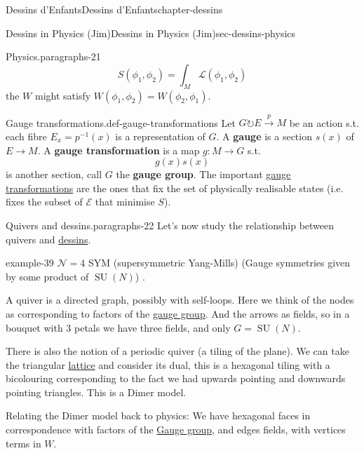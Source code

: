 \documentclass[oneside,10pt,]{book}
\newcommand{\terminology}[1]{\textbf{#1}}
\numberwithin{equation}{section}
\newcommand{\inv}{^{-1}}
\newcommand{\acts}{\circlearrowright}
\DeclareMathOperator{\specialunitary}{SU}
\begin{document}
\begin{chapterptx}{Dessins d'Enfants}{}{Dessins d'Enfants}{}{}{chapter-dessins}
\begin{sectionptx}{Dessins in Physics (Jim)}{}{Dessins in Physics (Jim)}{}{}{sec-dessins-physics}
\begin{paragraphs}{Physics.}{paragraphs-21}
\begin{equation*}
S(\phi_1, \phi_2) = \int_M \mathcal L(\phi_1,\phi_2)
\end{equation*}
the \(W\) might satisfy \(W(\phi_1, \phi_2) = W(\phi_2, \phi_1)\).%
\begin{definition}{Gauge transformations.}{def-gauge-transformations}%
\hypertarget{p-771}{}%
Let \(G \acts E \xrightarrow p M\) be an action s.t. each fibre \(E_x = p \inv(x)\) is a representation of \(G\). A \terminology{gauge} is a section \(s(x)\) of \(E \to M\). A \terminology{gauge transformation} is a map \(g\colon M \to G\) s.t.%
\begin{equation*}
g(x) s(x)
\end{equation*}
is another section, call \(G\) the \terminology{gauge group}. The important \hyperref[def-gauge-transformations]{gauge transformations} are the ones that fix the set of physically realisable states (i.e. fixes the subset of \(\mathcal E\) that minimise \(S\)).%
\end{definition}
\end{paragraphs}%
\begin{paragraphs}{Quivers and dessins.}{paragraphs-22}%
\hypertarget{p-772}{}%
Let's now study the relationship between quivers and \hyperref[def-dessin-denfant]{dessins}.%
\begin{example}{}{example-39}%
\hypertarget{p-773}{}%
\(\mathcal N = 4\) SYM (supersymmetric Yang-Mills) (Gauge symmetries given by some product of \(\specialunitary (N)\)) .%
\end{example}
\hypertarget{p-774}{}%
A quiver is a directed graph, possibly with self-loops. Here we think of the nodes as corresponding to factors of the \hyperref[def-gauge-transformations]{gauge group}. And the arrows as fields, so in a bouquet with 3 petals we have three fields, and only \(G = \specialunitary (N)\).%
\par
\hypertarget{p-775}{}%
There is also the notion of a periodic quiver (a tiling of the plane). We can take the triangular \hyperref[def-buntes-lattice]{lattice} and consider its dual, this is a hexagonal tiling with a bicolouring corresponding to the fact we had upwards pointing and downwards pointing triangles. This is a Dimer model.%
\par
\hypertarget{p-776}{}%
Relating the Dimer model back to physics: We have hexagonal faces in correspondence with factors of the \hyperref[def-gauge-transformations]{Gauge group}, and edges fields, with vertices terms in \(W\).%
\par
\hypertarget{p-777}{}%

\end{paragraphs}
\end{sectionptx}
\end{chapterptx}
\end{document}
